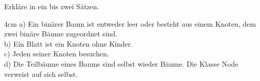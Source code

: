 \question[4]
Erkläre in ein bis zwei Sätzen.
\begin{solutionbox}{4cm}
a) Ein binärer Baum ist entweder leer oder besteht aus einem Knoten, dem zwei binäre Bäume zugeordnet sind. \\
b) Ein Blatt ist ein Knoten ohne Kinder. \\
c) Jeden seiner Knoten besuchen. \\
d) Die Teilbäume eines Baums sind selbst wieder Bäume. Die Klasse Node verweist auf sich selbst.
\end{solutionbox}
